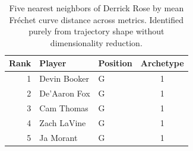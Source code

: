 \begin{table}[htbp]
  \centering\small
  \begin{tabular}{rllc}
    \toprule
    Rank & Player & Position & Archetype \\
    \midrule
    1 & Devin Booker & G & 1 \\
    2 & De'Aaron Fox & G & 1 \\
    3 & Cam Thomas & G & 1 \\
    4 & Zach LaVine & G & 1 \\
    5 & Ja Morant & G & 1 \\
    \bottomrule
  \end{tabular}
  \caption{Five nearest neighbors of Derrick Rose by mean Fr\'{e}chet curve distance across metrics. Identified purely from trajectory shape without dimensionality reduction.}
  \label{tab:Derrick_Rose_frechet_curve_neighbors}
\end{table}


